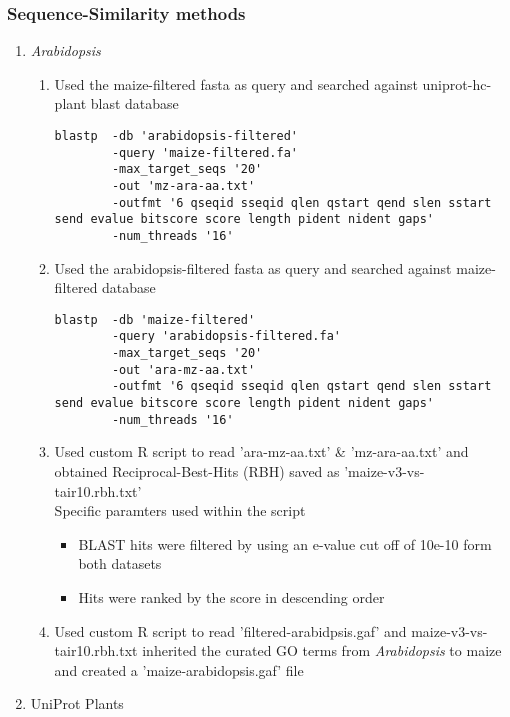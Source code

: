   \subsubsection{Sequence-Similarity methods}
  \begin{enumerate}
    \item \emph{Arabidopsis}
    \begin{enumerate}
      \item Used the maize-filtered fasta as query and searched against uniprot-hc-plant blast database
      \begin{verbatim}
blastp  -db 'arabidopsis-filtered'
        -query 'maize-filtered.fa'
        -max_target_seqs '20'
        -out 'mz-ara-aa.txt'
        -outfmt '6 qseqid sseqid qlen qstart qend slen sstart send evalue bitscore score length pident nident gaps'
        -num_threads '16'
      \end{verbatim}
      \item Used the arabidopsis-filtered fasta as query and searched against maize-filtered database
      \begin{verbatim}
blastp  -db 'maize-filtered'
        -query 'arabidopsis-filtered.fa'
        -max_target_seqs '20'
        -out 'ara-mz-aa.txt'
        -outfmt '6 qseqid sseqid qlen qstart qend slen sstart send evalue bitscore score length pident nident gaps'
        -num_threads '16'
      \end{verbatim}
      \item Used custom R script to read 'ara-mz-aa.txt' \& 'mz-ara-aa.txt' and obtained Reciprocal-Best-Hits (RBH) saved as 'maize-v3-vs-tair10.rbh.txt' \\
          Specific paramters used within the script
        \begin{itemize}
          \item BLAST hits were filtered by using an e-value cut off of 10e-10 form both datasets
          \item Hits were ranked by the score in descending order
        \end{itemize}
      \item Used custom R script to read 'filtered-arabidpsis.gaf' and maize-v3-vs-tair10.rbh.txt inherited the curated GO terms from \emph{Arabidopsis} to maize and created a 'maize-arabidopsis.gaf' file
    \end{enumerate}
    \item UniProt Plants
    \begin{enumerate}

\end{enumerate}
\end{enumerate}
